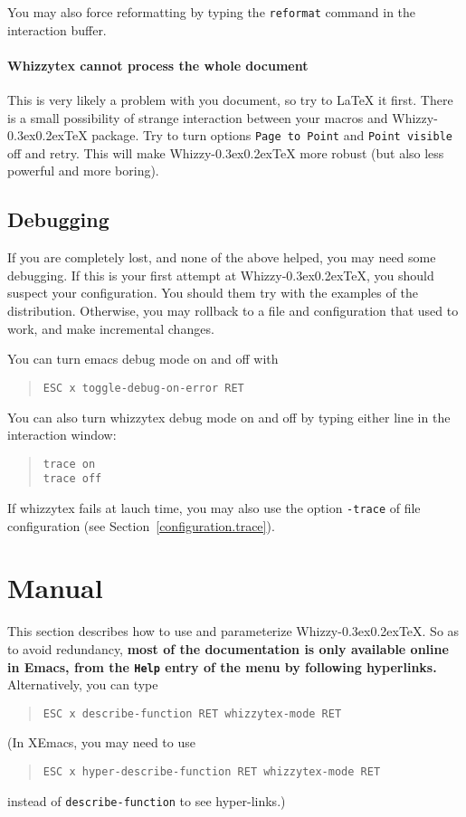 \documentclass[12pt]{article}
\makeatletter
\let \lst \verb
\def \whizzy {{Whizzy\kern -0.3ex\raise 0.2ex\hbox{\let \@\relax\TeX}}}
\makeatother
\begin{document}
You may also force reformatting by typing the \lst"reformat" command
in the interaction buffer. 


\paragraph {Whizzytex cannot process the whole document}

This is very likely a problem with you document, so try to {\LaTeX} it 
first. There is a small possibility of strange interaction between
your macros and {\whizzy} package. Try to turn options 
{\tt Page to Point} and {\tt Point visible} off and retry. 
This will make {\whizzy} more robust (but also less powerful and more
boring). 

\subsection {Debugging}

If you are completely lost, and none of the above helped, you may need some
debugging.  If this is your first attempt at {\whizzy}, you should suspect your
configuration. You should them try with the examples of the distribution. 
Otherwise, you may rollback to a file and configuration that used to work, 
and make incremental changes.

You can turn emacs debug mode on and off with
\begin{quote}
\begin{verbatim}
ESC x toggle-debug-on-error RET
\end{verbatim}
\end{quote}
You can also turn whizzytex debug mode on and off by typing either line
in the interaction window:
\begin{quote}
\begin{verbatim}
trace on
trace off
\end{verbatim}
\end{quote}
If whizzytex fails at lauch time, you may also use the option {\tt -trace}
of file configuration (see Section~\ref {configuration.trace}).


\section{Manual} 
\label{manual}

This section describes how to use and parameterize {\whizzy}.  So as to
avoid redundancy, {\bf most of the documentation is only available online in
Emacs, from the \lst"Help" entry of the menu by following hyperlinks.}
%
Alternatively, you can type
\begin{quote}
\begin{verbatim}
ESC x describe-function RET whizzytex-mode RET
\end{verbatim}
\end{quote}
(In XEmacs, you may need to use
\begin{quote}
\begin{verbatim}
ESC x hyper-describe-function RET whizzytex-mode RET
\end{verbatim}
\end{quote}
instead of \lst"describe-function" to see hyper-links.)
\end{document}
